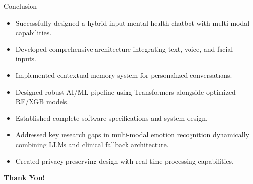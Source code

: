 \documentclass{beamer}
\begin{document}
\begin{frame}{Conclusion}
\begin{itemize}
    \item Successfully designed a hybrid-input mental health chatbot with multi-modal capabilities.
    \item Developed comprehensive architecture integrating text, voice, and facial inputs.
    \item Implemented contextual memory system for personalized conversations.
    \item Designed robust AI/ML pipeline using Transformers alongside optimized RF/XGB models.
    \item Established complete software specifications and system design.
    \item Addressed key research gaps in multi-modal emotion recognition dynamically combining LLMs and clinical fallback architecture.
    \item Created privacy-preserving design with real-time processing capabilities.
\end{itemize}
\end{frame}

\begin{frame}[plain]
    \centering
    {\Huge \textbf{Thank You!}}
\end{frame}
\end{document}
